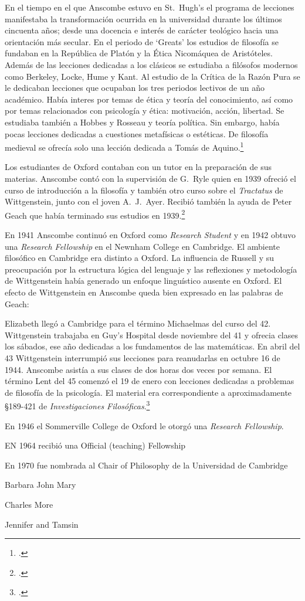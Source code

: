   En el tiempo en el que Anscombe estuvo en St.~Hugh's el programa de lecciones
  manifestaba la transformación ocurrida en la universidad durante los últimos
  cincuenta años; desde una docencia e interés de carácter teológico hacia una
  orientación más secular. En el periodo de `Greats' los estudios de filosofía se
  fundaban en la República de Platón y la Ética Nicomáquea de Aristóteles. Además
  de las lecciones dedicadas a los clásicos se estudiaba a filósofos modernos como
  Berkeley, Locke, Hume y Kant. Al estudio de la Crítica de la Razón Pura se le
  dedicaban lecciones que ocupaban los tres periodos lectivos de un año académico.
  Había interes por temas de ética y teoría del conocimiento, así como por temas
  relacionados con psicología y ética: motivación, acción, libertad. Se estudiaba
  también a Hobbes y Rosseau y teoría política. Sin embargo, había pocas lecciones
  dedicadas a cuestiones metafísicas o estéticas. De filosofía medieval se ofrecía
  solo una lección dedicada a Tomás de Aquino.\footcite[cf.~][pp.~23-24]{accint}

  Los estudiantes de Oxford contaban con un tutor en la preparación de sus
  materias. Anscombe contó con la supervisión de G.~Ryle quien en 1939 ofreció
  el curso de introducción a la filosofía y también otro curso sobre el
  \emph{Tractatus} de Wittgenstein, junto con el joven A.~J.~Ayer. Recibió
  también la ayuda de Peter Geach que había terminado sus estudios en
  1939.\footcite[cf.~][p.~24]{accint}

  En 1941 Anscombe continuó en Oxford como \emph{Research Student} y en 1942
  obtuvo una \emph{Research Fellowship} en el Newnham College en Cambridge. El
  ambiente filosófico en Cambridge era distinto a Oxford. La influencia de
  Russell y su preocupación por la estructura lógica del lenguaje y las
  reflexiones y metodología de Wittgenstein había generado un enfoque
  linguístico ausente en Oxford. El efecto de Wittgenstein en Anscombe queda
  bien expresado en las palabras de Geach:


  Elizabeth llegó a Cambridge para el término Michaelmas del curso del 42.
  Wittgenstein trabajaba en Guy's Hospital desde noviembre del 41 y ofrecia
  clases los sábados, ese año dedicadas a los fundamentos de las matemáticas. En
  abril del 43 Wittgenstein interrumpió sus lecciones para reanudarlas en
  octubre 16 de 1944. Anscombe asistía a sus clases de dos horas dos veces por
  semana. El término Lent del 45 comenzó el 19 de enero con lecciones dedicadas
  a problemas de filosofía de la psicología. El material era correspondiente a
  aproximadamente \S189-421 de \emph{Investigaciones
    Filosóficas}.\footcite[cf.~][pp.~354-356]{pubnpriv}


En 1946 el Sommerville College de Oxford le otorgó una \emph{Research Fellowship}.

EN 1964 recibió una Official (teaching) Fellowship

En 1970 fue nombrada al Chair of Philosophy de la Universidad de Cambridge

Barbara
John
Mary

Charles
More

Jennifer and Tamsin
